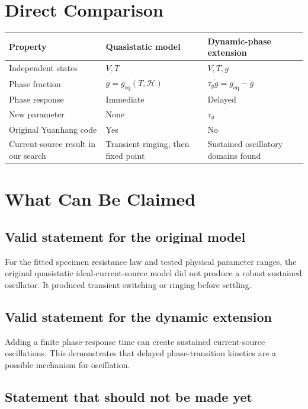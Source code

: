 \documentclass[11pt]{article}
\begin{document}
\section{Direct Comparison}

\begin{center}
\begin{tabular}{p{}p{}p{}}
\toprule
Property & Quasistatic model & Dynamic-phase extension \\
\midrule
Independent states & $V,T$ & $V,T,g$ \\
Phase fraction & $g=g_{\mathrm{eq}}(T,\mathcal{H})$ & $\tau_g\dot g=g_{\mathrm{eq}}-g$ \\
Phase response & Immediate & Delayed \\
New parameter & None & $\tau_g$ \\
Original Yuanhang code & Yes & No \\
Current-source result in our search & Transient ringing, then fixed point & Sustained oscillatory domains found \\
\bottomrule
\end{tabular}
\end{center}

\section{What Can Be Claimed}

\subsection{Valid statement for the original model}

For the fitted specimen resistance law and tested physical parameter ranges, the original quasistatic ideal-current-source model did not produce a robust sustained oscillator. It produced transient switching or ringing before settling.

\subsection{Valid statement for the dynamic extension}

Adding a finite phase-response time can create sustained current-source oscillations. This demonstrates that delayed phase-transition kinetics are a possible mechanism for oscillation.

\subsection{Statement that should not be made yet}
\end{document}
